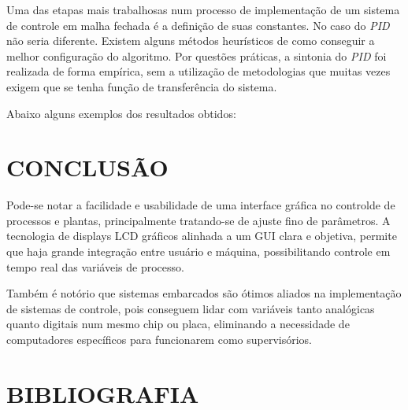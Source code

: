 \documentclass[times, twoside, watermark]{artigo}
\begin{document}
Uma das etapas mais trabalhosas num processo de implementação de um sistema de controle em malha fechada é a definição de suas constantes. 
No caso do \textit{PID} não seria diferente. Existem alguns métodos heurísticos de como conseguir a melhor configuração do algoritmo.
Por questões práticas, a sintonia do \textit{PID} foi realizada de forma empírica, sem a utilização de metodologias que muitas vezes exigem que se tenha função de transferência do sistema.

Abaixo alguns exemplos dos resultados obtidos:




\section*{CONCLUSÃO}
Pode-se notar a facilidade e usabilidade de uma interface gráfica no controlde de processos e plantas, principalmente tratando-se de ajuste fino de parâmetros.
A tecnologia de displays LCD gráficos alinhada a um GUI clara e objetiva, permite que haja grande integração entre usuário e máquina, possibilitando controle em tempo real das variáveis de processo.

Também é notório que sistemas embarcados são ótimos aliados na implementação de sistemas de controle, pois conseguem lidar com variáveis tanto analógicas quanto digitais num mesmo chip ou placa, eliminando a necessidade de computadores específicos para funcionarem como supervisórios.


\section*{BIBLIOGRAFIA}



\end{document}
